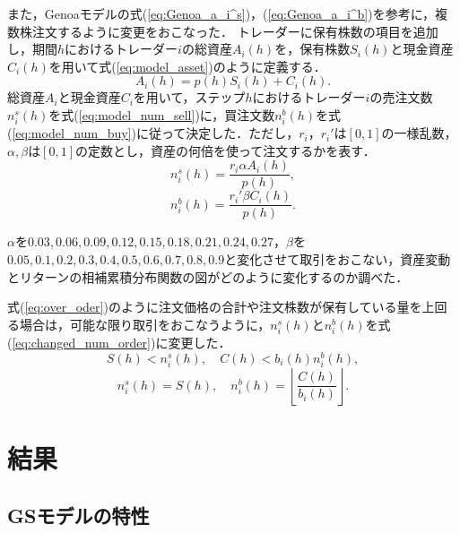 \documentclass[titlepage]{jsreport}
\begin{document}
また，Genoaモデルの式(\ref{eq:Genoa_a_i^s})，(\ref{eq:Genoa_a_i^b})を参考に，複数株注文するように変更をおこなった．
トレーダーに保有株数の項目を追加し，期間$h$におけるトレーダー$i$の総資産$A_i(h)$を，保有株数$S_i(h)$と現金資産$C_i(h)$を用いて式(\ref{eq:model_asset})のように定義する．
\begin{equation}
    A_i(h) = p(h) S_i(h) + C_i(h). \label{eq:model_asset}
\end{equation}
総資産$A_i$と現金資産$C_i$を用いて，ステップ$h$におけるトレーダー$i$の売注文数$n_i^s(h)$を式(\ref{eq:model_num_sell})に，買注文数$n_i^b(h)$を式(\ref{eq:model_num_buy})に従って決定した．ただし，$r_i$，$r_i'$は$[0, 1]$の一様乱数，$\alpha, \beta$は$[0, 1]$の定数とし，資産の何倍を使って注文するかを表す．
\begin{equation}
    n_i^s(h) = \frac{r_i \alpha A_i(h)}{p(h)}, \label{eq:model_num_sell}
\end{equation}
\begin{equation}
    n_i^b(h) = \frac{r_i' \beta C_i(h)}{p(h)}. \label{eq:model_num_buy}
\end{equation}

$\alpha$を$0.03, 0.06, 0.09, 0.12, 0.15, 0.18, 0.21, 0.24, 0.27$，$\beta$を$0.05, 0.1, 0.2, 0.3, 0.4, 0.5, 0.6, 0.7, 0.8, 0.9$と変化させて取引をおこない，資産変動とリターンの相補累積分布関数の図がどのように変化するのか調べた．

式(\ref{eq:over_oder})のように注文価格の合計や注文株数が保有している量を上回る場合は，可能な限り取引をおこなうように，$n_i^s(h)$と$n_i^b(h)$を式(\ref{eq:changed_num_order})に変更した．
\begin{equation}
    S(h) < n_i^s(h), \quad C(h) < b_i(h) n_i^b(h), \label{eq:over_oder}
\end{equation}
\begin{equation}
    n_i^s(h) = S(h), \quad n_i^b(h) = \left \lfloor \frac{C(h)}{b_i(h)} \right \rfloor. \label{eq:changed_num_order}
\end{equation}




\chapter{結果} \label{chap:results}
\section{GSモデルの特性}\label{chap:result_GS}
\end{document}
